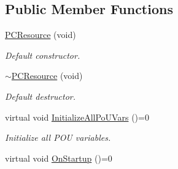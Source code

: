 \subsection*{Public Member Functions}
\begin{DoxyCompactItemize}
\item 
\hyperlink{classpc__emulator_1_1PCResource_af36e5647ce9cd1b05765f5225d69faa5}{P\+C\+Resource} (void)\hypertarget{classpc__emulator_1_1PCResource_af36e5647ce9cd1b05765f5225d69faa5}{}\label{classpc__emulator_1_1PCResource_af36e5647ce9cd1b05765f5225d69faa5}

\begin{DoxyCompactList}\small\item\em Default constructor. \end{DoxyCompactList}\item 
\hyperlink{classpc__emulator_1_1PCResource_a7cf56b58f18c50a36894ede2a8cf22e4}{$\sim$\+P\+C\+Resource} (void)\hypertarget{classpc__emulator_1_1PCResource_a7cf56b58f18c50a36894ede2a8cf22e4}{}\label{classpc__emulator_1_1PCResource_a7cf56b58f18c50a36894ede2a8cf22e4}

\begin{DoxyCompactList}\small\item\em Default destructor. \end{DoxyCompactList}\item 
virtual void \hyperlink{classpc__emulator_1_1PCResource_a9fafb1da52428dc64831392fde44de7f}{Initialize\+All\+Po\+U\+Vars} ()=0
\begin{DoxyCompactList}\small\item\em Initialize all P\+OU variables. \end{DoxyCompactList}\item 
virtual void \hyperlink{classpc__emulator_1_1PCResource_adf08fafb3739903aaa90812a2ec80fca}{On\+Startup} ()=0\hypertarget{classpc__emulator_1_1PCResource_adf08fafb3739903aaa90812a2ec80fca}{}\label{classpc__emulator_1_1PCResource_adf08fafb3739903aaa90812a2ec80fca}


\end{DoxyCompactItemize}
